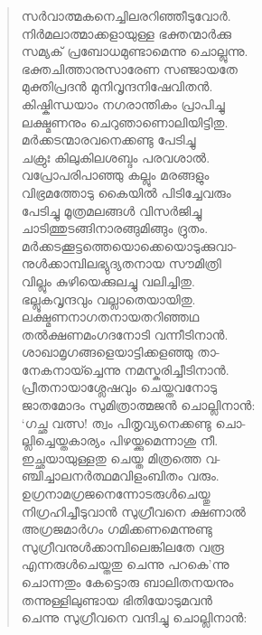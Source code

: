 \begin{verse}
സര്‍വാത്മകനെച്ചിലരറിഞ്ഞീടുവോര്‍.\\
നിര്‍മലാത്മാക്കളായുള്ള ഭക്തന്മാര്‍ക്കു\\
സമ്യക് പ്രബോധമുണ്ടാമെന്നു ചൊല്ലുന്നു.\\
ഭക്തചിത്താനുസാരേണ സഞ്ജായതേ\\
മുക്തിപ്രദന്‍ മുനിവൃന്ദനിഷേവിതന്‍.\\
കിഷ്കിന്ധയാം നഗരാന്തികം പ്രാപിച്ചു\\
ലക്ഷ്മണനും ചെറുഞാണൊലിയിട്ടിതു.\\
മര്‍ക്കടന്മാരവനെക്കണ്ടു പേടിച്ചു\\
ചക്രുഃ കിലുകിലശബ്ദം പരവശാല്‍.\\
വപ്രോപരിപാഞ്ഞു കല്ലും മരങ്ങളും\\
വിഭ്രമത്തോടു കൈയില്‍ പിടിച്ചേവരും\\
പേടിച്ചു മൂത്രമലങ്ങള്‍ വിസര്‍ജിച്ചു\\
ചാടിത്തുടങ്ങിനാരങ്ങുമിങ്ങും ദ്രുതം.\\
മര്‍ക്കടക്കൂട്ടത്തെയൊക്കെയൊടുക്കുവാ-\\
നുള്‍ക്കാമ്പിലഭ്യുദ്യതനായ സൗമിത്രി\\
വില്ലും കുഴിയെക്കുലച്ചു വലിച്ചിതു.\\
ഭല്ലൂകവൃന്ദവും വല്ലാതെയായിതു.\\
ലക്ഷ്മണനാഗതനായതറിഞ്ഞഥ\\
തല്‍ക്ഷണമംഗദനോടി വന്നീടിനാന്‍.\\
ശാഖാമൃഗങ്ങളെയാട്ടിക്കളഞ്ഞു താ-\\
നേകനായ്ച്ചെന്നു നമസ്കരിച്ചീടിനാന്‍.\\
പ്രീതനായാശ്ലേഷവും ചെയ്തവനോടു\\
ജാതമോദം സുമിത്രാത്മജന്‍ ചൊല്ലിനാന്‍:\\
‘ഗച്ഛ വത്സ! ത്വം പിതൃവ്യനെക്കണ്ടു ചൊ-\\
ല്ലിച്ചെയ്തകാര്യം പിഴയ്ക്കുമെന്നാശു നീ.\\
ഇച്ഛയായുള്ളതു ചെയ്ത മിത്രത്തെ വ-\\
ഞ്ചിച്ചാലനര്‍ത്ഥമവിളംബിതം വരും.\\
ഉഗ്രനാമഗ്രജനെന്നോടരുള്‍ചെയ്തു\\
നിഗ്രഹിച്ചീടുവാന്‍ സുഗ്രീവനെ ക്ഷണാല്‍\\
അഗ്രജമാര്‍ഗം ഗമിക്കണമെന്നുണ്ടു\\
സുഗ്രീവനുള്‍ക്കാമ്പിലെങ്കിലതേ വരൂ\\
എന്നരുള്‍ചെയ്തതു ചെന്നു പറകെ’ന്നു\\
ചൊന്നതും കേട്ടൊരു ബാലിതനയനും\\
തന്നുള്ളിലുണ്ടായ ഭിതിയോടുമവന്‍\\
ചെന്നു സുഗ്രീവനെ വന്ദിച്ചു ചൊല്ലിനാന്‍:\\

\end{verse}
